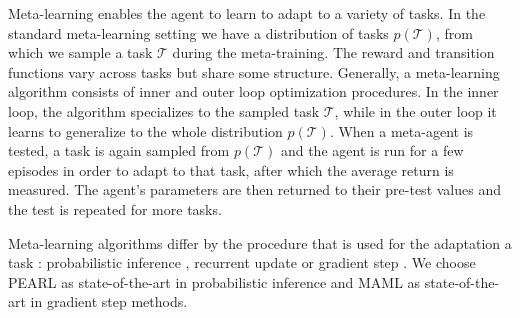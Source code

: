 Meta-learning enables the agent to learn to adapt to a variety of tasks. In the standard meta-learning setting we have a distribution of tasks $p(\mathcal{T})$, from which we sample a task $\mathcal{T}$ during the meta-training. The reward and transition functions vary across tasks but share some structure. Generally, a meta-learning algorithm consists of inner and outer loop optimization procedures. In the inner loop, the algorithm specializes to the sampled task $\mathcal{T}$, while in the outer loop it learns to generalize to the whole distribution $p(\mathcal{T})$. When a meta-agent is tested, a task is again sampled from $p(\mathcal{T})$ and the agent is run for a few episodes in order to adapt to that task, after which the average return is measured. The agent's parameters are  then returned to their pre-test values and the test is repeated for more tasks.  

Meta-learning algorithms differ by the procedure that is used for the adaptation a task \cite{meld}: probabilistic inference  \cite{PEARL, VariBad},  recurrent update \cite{meld, RL2} or gradient step \cite{maml}.  We choose PEARL  \cite{PEARL} as state-of-the-art in probabilistic inference and MAML \cite{maml} as state-of-the-art in gradient step methods.

